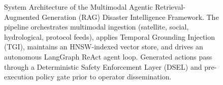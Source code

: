 \documentclass[conference]{IEEEtran}
\begin{document}
\begin{figure}[!t]
{
}
\caption{System Architecture of the Multimodal Agentic Retrieval-Augmented Generation (RAG) Disaster Intelligence Framework. The pipeline orchestrates multimodal ingestion (satellite, social, hydrological, protocol feeds), applies Temporal Grounding Injection (TGI), maintains an HNSW-indexed vector store, and drives an autonomous LangGraph ReAct agent loop. Generated actions pass through a Deterministic Safety Enforcement Layer (DSEL) and pre-execution policy gate prior to operator dissemination.}
\label{fig:system_architecture}
\end{figure}
\end{document}
